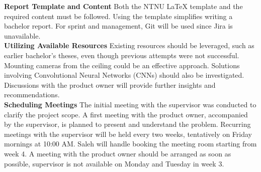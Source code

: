 \textbf{Report Template and Content}  
Both the NTNU LaTeX template and the required content must be followed. Using the template simplifies writing a bachelor report. For sprint and management, Git will be used since Jira is unavailable. \\

\textbf{Utilizing Available Resources}  
Existing resources should be leveraged, such as earlier bachelor’s theses, even though previous attempts were not successful. Mounting cameras from the ceiling could be an effective approach. Solutions involving Convolutional Neural Networks (CNNs) should also be investigated. Discussions with the product owner will provide further insights and recommendations. \\

\textbf{Scheduling Meetings}  
The initial meeting with the supervisor was conducted to clarify the project scope. A first meeting with the product owner, accompanied by the supervisor, is planned to present and understand the problem. Recurring meetings with the supervisor will be held every two weeks, tentatively on Friday mornings at 10:00 AM. Saleh will handle booking the meeting room starting from week 4. A meeting with the product owner should be arranged as soon as possible, supervisor is not available on Monday and Tuesday in week 3. 